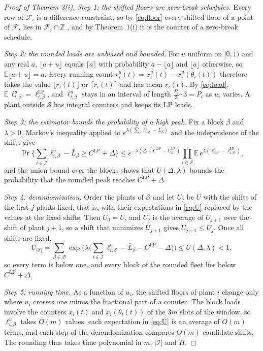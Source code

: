 \documentclass[11pt]{article}
\newcommand{\calF}{\mathcal{F}}
\newcommand{\calB}{\mathcal{B}}
\newcommand{\calS}{\mathcal{S}}
\newcommand{\calI}{\mathcal{I}}
\newcommand{\Z}{\mathbb{Z}}
\newcommand{\CLP}{C^{\mathrm{LP}}}
\begin{document}
\begin{proof}[Proof of Theorem 3(i)]
\emph{Step 1: the shifted floors are zero-break schedules.} Every row of $\calF_i$ is a difference constraint, so by
\eqref{eq:floor} every shifted floor of a point of $\calF_i$ lies in $\calF_i\cap\Z$ \cite{bansal2008sicomp}, and by
Theorem~1(i) it is the counter of a zero-break schedule.

\emph{Step 2: the rounded loads are unbiased and bounded.} For $u$ uniform on $[0,1)$ and any real $a$, $\lfloor
a+u\rfloor$ equals $\lceil a\rceil$ with probability $a-\lfloor a\rfloor$ and $\lfloor a\rfloor$ otherwise, so
$\mathbb E\lfloor a+u\rfloor=a$. Every running count $r_i^u(t)=x_i^u(t)-x_i^u(\theta_i(t))$ therefore takes the value
$\lfloor r_i(t)\rfloor$ or $\lceil r_i(t)\rceil$ and has mean $r_i(t)$. By \eqref{eq:load}, $\mathbb
E\,\ell^u_{i,\beta}=\ell^{\mathrm{LP}}_{i,\beta}$, and $\ell^u_{i,\beta}$ stays in an interval of length
$\tfrac{P_i}{3}\cdot3=P_i$ as $u_i$ varies. A plant outside $\calS$ has integral counters and keeps its LP loads.

\emph{Step 3: the estimator bounds the probability of a high peak.} Fix a block $\beta$ and $\lambda>0$. Markov's
inequality applied to $e^{\lambda(\sum_i\ell^u_{i,\beta}-\bar L_\beta)}$ and the independence of the shifts give
\[
\Pr\Big\{\sum_{i\in\calI}\ell^u_{i,\beta}-\bar L_\beta\ge\CLP+\Delta\Big\}
\le e^{-\lambda(\Delta+\CLP-\CLP_\beta)}\prod_{i\in\calS}\mathbb E\,e^{\lambda(\ell^u_{i,\beta}-\ell^{\mathrm{LP}}_{i,\beta})},
\]
and the union bound over the blocks shows that $U(\Delta,\lambda)$ bounds the probability that the rounded peak
reaches $\CLP+\Delta$.

\emph{Step 4: derandomization.} Order the plants of $\calS$ and let $U_j$ be $U$ with the shifts of the first $j$ plants
fixed, that is, with their expectations in \eqref{eq:U} replaced by the values at the fixed shifts. Then $U_0=U$, and
$U_{j}$ is the average of $U_{j+1}$ over the shift of plant $j+1$, so a shift that minimizes $U_{j+1}$ gives
$U_{j+1}\le U_j$. Once all shifts are fixed,
\[
U_{|\calS|}=\sum_{\beta\in\calB}\exp\Big(\lambda\Big(\sum_{i\in\calI}\ell^u_{i,\beta}-\bar L_\beta-\CLP-\Delta\Big)\Big)
\le U(\Delta,\lambda)<1,
\]
so every term is below one, and every block of the rounded fleet lies below $\CLP+\Delta$.

\emph{Step 5: running time.} As a function of $u_i$, the shifted floors of plant $i$ change only where $u_i$ crosses one
minus the fractional part of a counter. The block loads involve the counters $x_i(t)$ and $x_i(\theta_i(t))$ of the
$3m$ slots of the window, so $\ell^u_{i,\beta}$ takes $O(m)$ values, each expectation in \eqref{eq:U} is an average of
$O(m)$ terms, and each step of the derandomization compares $O(m)$ candidate shifts. The rounding thus takes time
polynomial in $m$, $|\calI|$ and $H$.


\end{proof}
\end{document}

